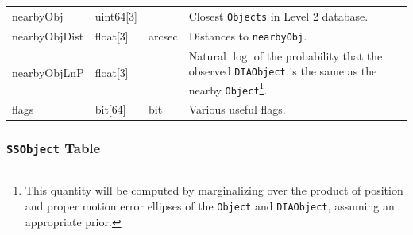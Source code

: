\documentclass[12pt]{article}
\newcommand{\code}[1]{\texttt{#1}}
\newcommand{\DIAObject}{\code{DIAObject}\xspace}
\newcommand{\DR}{{Level 2 database}\xspace}
\newcommand{\Object}{\code{Object}\xspace}
\newcommand{\Objects}{\code{Objects}\xspace}
\newcommand{\SSObject}{\code{SSObject}\xspace}
\begin{document}
\begin{center}
\begin{longtable}{p{3cm}p{2cm}p{2cm}p{5cm}}
nearbyObj   & uint64[3] & ~ & Closest \Objects in \DR. \\

nearbyObjDist   & float[3] & arcsec & Distances to \texttt{nearbyObj}. \\

nearbyObjLnP   & float[3] & ~ &  Natural $\log$ of the probability that the observed \DIAObject is the same as the nearby \Object\footnote{This quantity will be computed by marginalizing over the product of position and proper motion error ellipses of the \Object and \DIAObject, assuming an appropriate prior.}. \\

flags & bit[64] & bit & Various useful flags. \\ \hline

\end{longtable}
\end{center}

\subsubsection{\SSObject Table}
\end{document}
